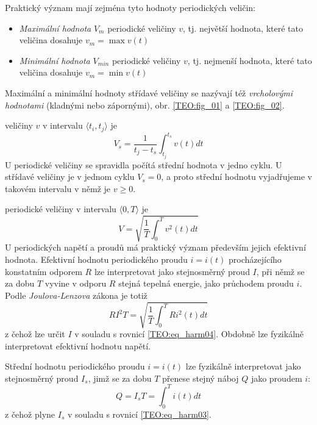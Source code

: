 {      %
          
    Praktický význam mají zejména tyto hodnoty periodických veličin:
    \begin{itemize}
      \item \emph{Maximální hodnota} $V_m$ periodické veličiny $v$, tj. největší hodnota, které
            tato veličina dosahuje $v_m=\max v(t)$
      \item \emph{Minimální hodnota} $V_{min}$ periodické veličiny $v$, tj. nejmenší hodnota, které
            tato veličina dosahuje $v_m=\min v(t)$
    \end{itemize}
      
    Maximální a minimální hodnoty střídavé veličiny se nazývají též \emph{vrcholovými hodnotami}
    (kladnými nebo zápornými), obr. \ref{TEO:fig_01} a \ref{TEO:fig_02}. 
    
     veličiny $v$ v intervalu $\langle t_i, t_j\rangle$ je 
    \begin{equation}\label{TEO:eq_harm03}
      V_s = \frac{1}{t_j-t_s}\int_{t_j}^{t_s}v(t)dt
    \end{equation}
    U periodické veličiny se spravidla počítá střední hodnota v jedno cyklu. U střídavé veličiny je
    v jednom cyklu $V_s = 0$,  a proto střední hodnotu vyjadřujeme v takovém intervalu v němž je
    $v\geq0$.
    
     periodické veličiny v intervalu $\langle 0, T\rangle$ je 
    \begin{equation}\label{TEO:eq_harm04}
      V = \sqrt{\frac{1}{T}\int_{0}^{T}v^2(t)dt}
    \end{equation}   
    U periodických napětí a proudů má praktický význam především jejich efektivní hodnota.
    Efektivní hodnotu periodického proudu $i=i(t)$ procházejícího konstatním odporem $R$ lze
    interpretovat jako stejnosměrný proud $I$, při němž se za dobu $T$ vyvine v odporu $R$ stejná
    tepelná energie, jako průchodem proudu $i$. Podle \emph{Joulova-Lenzova} zákona je totiž
    \begin{equation}\label{TEO:eq_harm05}
      RI^2T = \sqrt{\frac{1}{T}\int_{0}^{T}Ri^2(t)dt}
    \end{equation}       
    z čehož lze určit $I$ v souladu s rovnicí \ref{TEO:eq_harm04}. Obdobně lze fyzikálně
    interpretovat efektivní hodnotu napětí.
    
    Střední hodnotu periodického proudu $i=i(t)$ lze fyzikálně interpretovat jako stejnosměrný
    proud $I_s$, jimž se za dobu $T$ přenese stejný náboj $Q$ jako proudem $i$:
    \begin{equation}\label{TEO:eq_harm06}
      Q = I_sT = \int_{0}^{T}i(t)dt
    \end{equation}       
    z čehož plyne $I_s$ v souladu s rovnicí \ref{TEO:eq_harm03}.  
    
}
